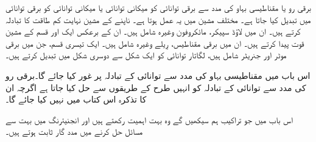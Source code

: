 برقی رو یا مقناطیسی بہاو کی مدد سے برقی توانائی کو میکانی توانائی یا میکانی توانائی کو برقی توانائی میں تبدیل کیا جاتا ہے۔ مختلف مشین میں یہ عمل ہوتا ہے۔ ناپنے کے مشین نہایت کم طاقت کا تبادلہ کرتے ہیں۔ ان میں لاؤڈ سپیکر، مائکروفون وغیرہ شامل ہیں۔ ان کے برعکس ایک اور قسم کے مشین قوت پیدا کرتے ہیں۔ ان میں برقی مقناطیس، رِیلے  وغیرہ شامل ہیں۔ ایک تیسری قسم، جن میں برقی موٹر اور جنریٹر شامل ہیں، لگاتار توانائی کو ایک شکل سے دوسری شکل میں تبدیل کرتے ہیں۔

اس باب میں مقناطیسی بہاو کی مدد سے توانائی کے تبادلہ پر غور کیا جائے گا۔برقی رو کی مدد سے توانائی کے تبادلہ کو انہیں طرح کے طریقوں سے حل کیا جاتا ہے اگرچہ ان کا تذکرہ اس کتاب میں نہیں کیا جائے گا۔

 اس باب میں جو تراکیب ہم سیکھیں گے وہ بہت اہمیت رکھتے ہیں اور انجنیئرنگ میں بہت سے مسائل حل کرنے میں مدد گار ثابت ہوتے ہیں۔

